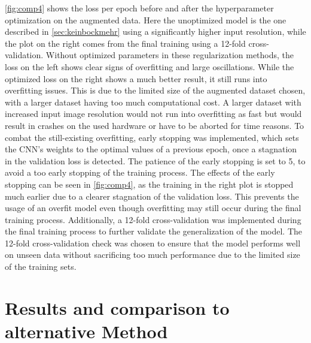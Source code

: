 \noindent
\autoref{fig:comp4} shows the loss per epoch before and after the hyperparameter optimization on the augmented data. Here the unoptimized model is the one described in \autoref{sec:keinbockmehr} using a significantly higher input resolution, while the plot on the right comes from the final training using a 12-fold cross-validation. Without optimized parameters in these regularization methods, the loss on the left shows clear signs of overfitting and large oscillations. While the optimized loss on the right shows a much better result, it still runs into overfitting issues. This is due to the limited size of the augmented dataset chosen, with a larger dataset having too much computational cost. A larger dataset with increased input image resolution would not run into overfitting as fast but would result in crashes on the used hardware or have to be aborted for time reasons. To combat the still-existing overfitting, early stopping was implemented, which sets the CNN's weights to the optimal values of a previous epoch, once a stagnation in the validation loss is detected. The patience of the early stopping is set to 5, to avoid a too early stopping of the training process. The effects of the early stopping can be seen in \autoref{fig:comp4}, as the training in the right plot is stopped much earlier due to a clearer stagnation of the validation loss. This prevents the usage of an overfit model even though overfitting may still occur during the final training process.
Additionally, a 12-fold cross-validation was implemented during the final training process to further validate the generalization of the model. The 12-fold cross-validation check was chosen to ensure that the model performs well on unseen data without sacrificing too much performance due to the limited size of the training sets. 
\section{Results and comparison to alternative Method}
    \label{sec:3}
